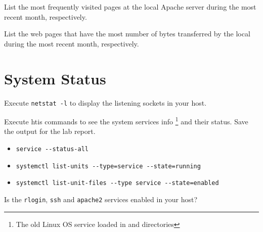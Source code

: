 \documentclass{../UTNetLab}
\begin{document}
    \begin{report}
    \item List the most frequently visited pages at the local Apache server during the most recent month, respectively.
    
    \item List the web pages that have the most number of bytes transferred by the local during the most recent month, respectively.
    \end{report}

\section{System Status}
    Execute \lstinline{netstat -l} to display the listening sockets in your host.

    Execute htis commands to see the system services info \footnote{The old Linux OS service loaded in and  directories} and their status. Save the output for the lab report.
    \begin{itemize}
        \item \lstinline{service --status-all}
        \item \lstinline{systemctl list-units --type=service --state=running}
        \item \lstinline{systemctl list-unit-files --type service --state=enabled}
    \end{itemize}
    
    \begin{report}
    \item Is the \lstinline{rlogin}, \lstinline{ssh} and \lstinline{apache2} services enabled in your host?
    \end{report}
\end{document}

